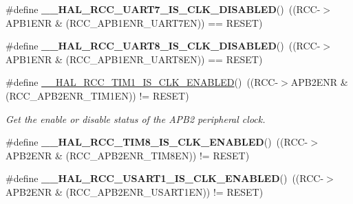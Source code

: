 \begin{DoxyCompactItemize}
\#define {\bfseries \+\_\+\+\_\+\+H\+A\+L\+\_\+\+R\+C\+C\+\_\+\+U\+A\+R\+T7\+\_\+\+I\+S\+\_\+\+C\+L\+K\+\_\+\+D\+I\+S\+A\+B\+L\+ED}()~((R\+CC-\/$>$A\+P\+B1\+E\+NR \& (R\+C\+C\+\_\+\+A\+P\+B1\+E\+N\+R\+\_\+\+U\+A\+R\+T7\+EN)) == R\+E\+S\+ET)
\item 
\mbox{\label{group___r_c_c_ex___peripheral___clock___enable___disable___status_ga3db2e9bae86ff5f5e376ce47599673c7}} 
\#define {\bfseries \+\_\+\+\_\+\+H\+A\+L\+\_\+\+R\+C\+C\+\_\+\+U\+A\+R\+T8\+\_\+\+I\+S\+\_\+\+C\+L\+K\+\_\+\+D\+I\+S\+A\+B\+L\+ED}()~((R\+CC-\/$>$A\+P\+B1\+E\+NR \& (R\+C\+C\+\_\+\+A\+P\+B1\+E\+N\+R\+\_\+\+U\+A\+R\+T8\+EN)) == R\+E\+S\+ET)
\item 
\#define \mbox{\hyperlink{group___r_c_c_ex___peripheral___clock___enable___disable___status_gad2b7c3a381d791c4ee728e303935832a}{\+\_\+\+\_\+\+H\+A\+L\+\_\+\+R\+C\+C\+\_\+\+T\+I\+M1\+\_\+\+I\+S\+\_\+\+C\+L\+K\+\_\+\+E\+N\+A\+B\+L\+ED}}()~((R\+CC-\/$>$A\+P\+B2\+E\+NR \& (R\+C\+C\+\_\+\+A\+P\+B2\+E\+N\+R\+\_\+\+T\+I\+M1\+EN)) != R\+E\+S\+ET)
\begin{DoxyCompactList}\small\item\em Get the enable or disable status of the A\+P\+B2 peripheral clock. \end{DoxyCompactList}\item 
\mbox{\label{group___r_c_c_ex___peripheral___clock___enable___disable___status_gadbc388ef3676e37b227320df83e9d1f2}} 
\#define {\bfseries \+\_\+\+\_\+\+H\+A\+L\+\_\+\+R\+C\+C\+\_\+\+T\+I\+M8\+\_\+\+I\+S\+\_\+\+C\+L\+K\+\_\+\+E\+N\+A\+B\+L\+ED}()~((R\+CC-\/$>$A\+P\+B2\+E\+NR \& (R\+C\+C\+\_\+\+A\+P\+B2\+E\+N\+R\+\_\+\+T\+I\+M8\+EN)) != R\+E\+S\+ET)
\item 
\mbox{\label{group___r_c_c_ex___peripheral___clock___enable___disable___status_ga59bd3cd20df76f885695fcdad1edce27}} 
\#define {\bfseries \+\_\+\+\_\+\+H\+A\+L\+\_\+\+R\+C\+C\+\_\+\+U\+S\+A\+R\+T1\+\_\+\+I\+S\+\_\+\+C\+L\+K\+\_\+\+E\+N\+A\+B\+L\+ED}()~((R\+CC-\/$>$A\+P\+B2\+E\+NR \& (R\+C\+C\+\_\+\+A\+P\+B2\+E\+N\+R\+\_\+\+U\+S\+A\+R\+T1\+EN)) != R\+E\+S\+ET)
\item 
\mbox{\label{group___r_c_c_ex___peripheral___clock___enable___disable___status_ga639ccb1e63662b309fc875bc608aa7e6}} 

\end{DoxyCompactItemize}
